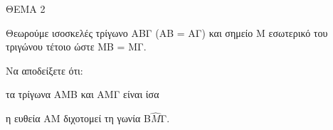 
ΘΕΜΑ 2

Θεωρούμε ισοσκελές τρίγωνο ΑΒΓ (ΑΒ = ΑΓ) και σημείο Μ εσωτερικό του τριγώνου τέτοιο ώστε ΜΒ = ΜΓ.

Να αποδείξετε ότι:

\begin{alist}
\item τα τρίγωνα ΑΜΒ και ΑΜΓ είναι ίσα 

\item η ευθεία ΑΜ διχοτομεί τη γωνία Β$\widehat{Μ}$Γ. 
\end{alist}
